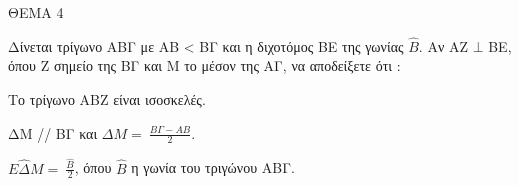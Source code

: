 
ΘΕΜΑ 4

Δίνεται τρίγωνο ΑΒΓ με ΑΒ \textless{} ΒΓ και η διχοτόμος ΒΕ της γωνίας $\widehat{B}$. Αν ΑΖ $\bot$ ΒΕ, όπου Ζ σημείο της ΒΓ και Μ το μέσον της ΑΓ, να αποδείξετε ότι :

\begin{alist}
\item Το τρίγωνο ΑΒΖ είναι ισοσκελές. 

\item ΔΜ // ΒΓ και $\Delta Μ = \ \frac{Β\Gamma - ΑΒ}{2}$. 

\item $Ε\widehat{\Delta}Μ = \ \frac{\widehat{Β}}{2}$, όπου $\widehat{B}$ η γωνία του τριγώνου ΑΒΓ. 


\end{alist}
